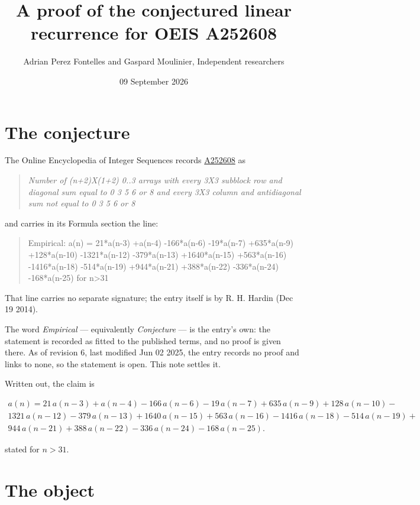 \documentclass[11pt]{article}
\title{A proof of the conjectured linear recurrence for OEIS A252608}
\author{Adrian Perez Fontelles and Gaspard Moulinier, Independent researchers}
\date{09 September 2026}
\theoremstyle{definition}
\begin{document}
\maketitle
\section{The conjecture}

The Online Encyclopedia of Integer Sequences records \href{https://oeis.org/A252608}{A252608} as

\begin{quote}\itshape Number of (n+2)X(1+2) 0..3 arrays with every 3X3 subblock row and diagonal sum equal to 0 3 5 6 or 8 and every 3X3 column and antidiagonal sum not equal to 0 3 5 6 or 8\end{quote}

and carries in its Formula section the line:

\begin{quote}\ttfamily Empirical: a(n) = 21*a(n-3) +a(n-4) -166*a(n-6) -19*a(n-7) +635*a(n-9) +128*a(n-10) -1321*a(n-12) -379*a(n-13) +1640*a(n-15) +563*a(n-16) -1416*a(n-18) -514*a(n-19) +944*a(n-21) +388*a(n-22) -336*a(n-24) -168*a(n-25) for n>31\end{quote}

That line carries no separate signature; the entry itself is by R. H. Hardin (Dec 19 2014).

The word {\itshape Empirical} --- equivalently {\itshape Conjecture} --- is the entry's own: the statement is recorded as fitted to the published terms, and no proof is given there. As of revision 6, last modified Jun 02 2025, the entry records no proof and links to none, so the statement is open. This note settles it.

Written out, the claim is

\begin{multline*} a(n) = 21\,a(n-3) + a(n-4) - 166\,a(n-6) - 19\,a(n-7) + 635\,a(n-9) + 128\,a(n-10) - \\ 1321\,a(n-12) - 379\,a(n-13) + 1640\,a(n-15) + 563\,a(n-16) - 1416\,a(n-18) - 514\,a(n-19) + \\ 944\,a(n-21) + 388\,a(n-22) - 336\,a(n-24) - 168\,a(n-25). \end{multline*}

stated for $n > 31$.

\section{The object}
\end{document}
